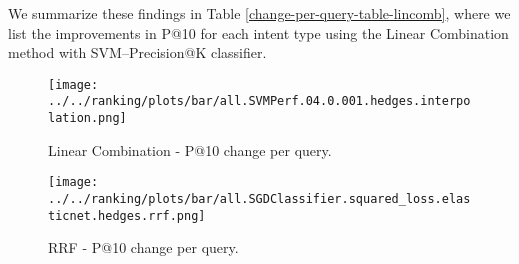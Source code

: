 We summarize these findings in Table \ref{change-per-query-table-lincomb},
where we list the improvements in P@10 for each intent type using the Linear Combination method with SVM--Precision@K
classifier.


\begin{table}[h!]
\centering
\caption{Linear Combination - Change in P@10 per intent type.}
\label{change-per-query-table-lincomb}
\end{table}

\begin{figure}
\centerline{
  \texttt{[image: ../../ranking/plots/bar/all.SVMPerf.04.0.001.hedges.interpolation.png]}
  }
  \caption{Linear Combination - P@10 change per query.}
  \label{interp-query}
\end{figure}

\begin{figure}
\centerline{
  \texttt{[image: ../../ranking/plots/bar/all.SGDClassifier.squared\_loss.elasticnet.hedges.rrf.png]}
  }
  \caption{RRF - P@10 change per query.}
  \label{rrf-query}
\end{figure}

